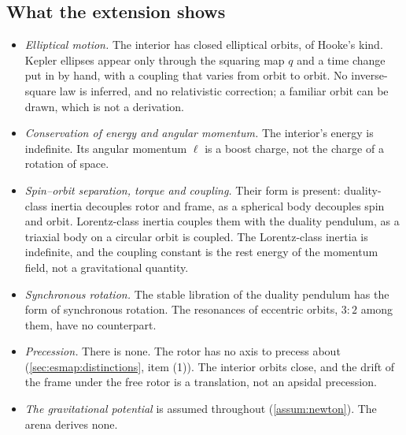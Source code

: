 \subsection{What the extension shows}
\label{sec:orbital:verdict}

\begin{itemize}
\item \emph{Elliptical motion.} The interior has closed elliptical orbits, of Hooke's kind. Kepler ellipses appear only through the squaring map
$q$ and a time change put in by hand, with a coupling that varies from orbit to orbit. No inverse-square law is inferred, and no relativistic
correction; a familiar orbit can be drawn, which is not a derivation.
\item \emph{Conservation of energy and angular momentum.} The interior's energy is indefinite. Its angular momentum $\ell$ is a boost charge, not
the charge of a rotation of space.
\item \emph{Spin--orbit separation, torque and coupling.} Their form is present: duality-class inertia decouples rotor and frame, as a spherical
body decouples spin and orbit. Lorentz-class inertia couples them with the duality pendulum, as a triaxial body on a circular orbit is coupled.
The Lorentz-class inertia is indefinite, and the coupling constant is the rest energy of the momentum field, not a gravitational quantity.
\item \emph{Synchronous rotation.} The stable libration of the duality pendulum has the form of synchronous rotation. The resonances of
eccentric orbits, $3{:}2$ among them, have no counterpart.
\item \emph{Precession.} There is none. The rotor has no axis to precess about (\cref{sec:esmap:distinctions}, item (1)). The interior orbits
close, and the drift of the frame under the free rotor is a translation, not an apsidal precession.
\item \emph{The gravitational potential} is assumed throughout (\cref{assum:newton}). The arena derives none.
\end{itemize}
